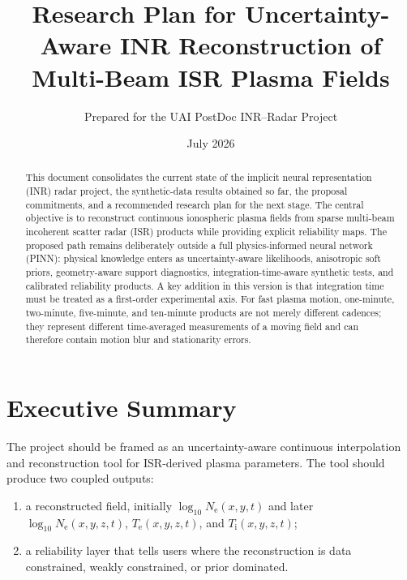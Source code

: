 \documentclass[11pt]{article}
\title{Research Plan for Uncertainty-Aware INR Reconstruction of Multi-Beam ISR Plasma Fields}
\author{Prepared for the UAI PostDoc INR--Radar Project}
\date{July 2026}
\newcommand{\Ne}{N_{\mathrm e}}
\newcommand{\Te}{T_{\mathrm e}}
\newcommand{\Ti}{T_{\mathrm i}}
\begin{document}
\maketitle

\begin{abstract}
This document consolidates the current state of the implicit neural representation (INR) radar
project, the synthetic-data results obtained so far, the proposal commitments, and a recommended
research plan for the next stage. The central objective is to reconstruct continuous ionospheric
plasma fields from sparse multi-beam incoherent scatter radar (ISR) products while providing
explicit reliability maps. The proposed path remains deliberately outside a full physics-informed
neural network (PINN): physical knowledge enters as uncertainty-aware likelihoods, anisotropic
soft priors, geometry-aware support diagnostics, integration-time-aware synthetic tests, and
calibrated reliability products. A key addition in this version is that integration time must be
treated as a first-order experimental axis. For fast plasma motion, one-minute, two-minute,
five-minute, and ten-minute products are not merely different cadences; they represent different
time-averaged measurements of a moving field and can therefore contain motion blur and
stationarity errors.
\end{abstract}

\tableofcontents

\section{Executive Summary}

The project should be framed as an uncertainty-aware continuous interpolation and reconstruction
tool for ISR-derived plasma parameters. The tool should produce two coupled outputs:
\begin{enumerate}[leftmargin=*]
  \item a reconstructed field, initially $\log_{10}\Ne(x,y,t)$ and later
  $\log_{10}\Ne(x,y,z,t)$, $\Te(x,y,z,t)$, and $\Ti(x,y,z,t)$;
  \item a reliability layer that tells users where the reconstruction is data constrained,
  weakly constrained, or prior dominated.
\end{enumerate}
\end{document}
